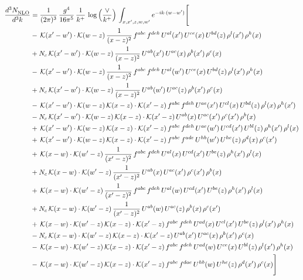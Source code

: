 \documentclass[9pt]{article}
\numberwithin{equation}{section}
\begin{document}
\begin{align}
    \frac{d^{3}N_{\rm NLO}^{\rm}}{d^{3}k}  & = \frac{1}{(2\pi)^{3}}\,\frac{g^{4}}{16\pi^{5}}\,\frac{1}{k^{+}}\,\log{\left(\frac{\vee}{k^{+}}\right)}\, \int_{x,x',z,w,w'}e^{-ik\cdot (w-w')}\Bigg[\notag\\ &
    -\,\mathcal{K}(x'-w')\cdot\mathcal{K}(w-z)\,\frac{1}{(x-z)^{2}}\,f^{abc}\,f^{deh}\,U^{al}(x')\,U^{ce}(x)\,U^{bd}(z)\,\rho^{l}(x')\,\rho^{h}(x)\notag \\ 
&+N_{c}\,\mathcal{K}(x'-w')\cdot\mathcal{K}(w-z)\,\frac{1}{(x-z)^{2}}\,U^{ab}(x')\,U^{ac}(x)\,\rho^{b}(x')\,\rho^{c}(x)\notag \\ 
&-\,\mathcal{K}(x'-w')\cdot\mathcal{K}(w-z)\,\frac{1}{(x-z)^{2}}\,f^{abc}\,f^{deh}\,U^{al}(w')\,U^{ce}(x)\,U^{bd}(z)\,\rho^{l}(x')\,\rho^{h}(x)\notag \\ 
&+N_{c}\,\mathcal{K}(x'-w')\cdot\mathcal{K}(w-z)\,\frac{1}{(x-z)^{2}}\,U^{ab}(w')\,U^{ac}(z)\,\rho^{b}(x')\,\rho^{c}(x)\notag \\ 
&-\,\mathcal{K}(x'-w')\cdot\mathcal{K}(w-z)\,\mathcal{K}(x-z)\cdot\mathcal{K}(x'-z)\,f^{abc}\,f^{deh}\,U^{ae}(x')\,U^{cl}(x)\,U^{bd}(z)\,\rho^{l}(x)\,\rho^{h}(x')\notag \\ 
&-N_{c}\,\mathcal{K}(x'-w')\cdot\mathcal{K}(w-z)\,\mathcal{K}(x-z)\cdot\mathcal{K}(x'-z)\,U^{ab}(x)\,U^{ac}(x')\,\rho^{c}(x')\,\rho^{b}(x)\notag \\ 
&+\,\mathcal{K}(x'-w')\cdot\mathcal{K}(w-z)\,\mathcal{K}(x-z)\cdot\mathcal{K}(x'-z)\,f^{abc}\,f^{deh}\,U^{ae}(w')\,U^{cd}(x')\,U^{bl}(z)\,\rho^{h}(x')\,\rho^{l}(x)\notag \\ 
&+\,\mathcal{K}(x'-w')\cdot\mathcal{K}(w-z)\,\mathcal{K}(x-z)\cdot\mathcal{K}(x'-z)\,f^{abc}\,f^{ade}\,U^{hb}(w')\,U^{he}(z)\,\rho^{d}(x)\,\rho^{c}(x')\notag \\ 
&+\,\mathcal{K}(x-w)\cdot\mathcal{K}(w'-z)\,\frac{1}{(x'-z)^{2}}\,f^{abc}\,f^{deh}\,U^{al}(x)\,U^{cd}(x')\,U^{be}(z)\,\rho^{h}(x')\,\rho^{l}(x)\notag \\ 
&+N_{c}\,\mathcal{K}(x-w)\cdot\mathcal{K}(w'-z)\,\frac{1}{(x'-z)^{2}}\,U^{ab}(x)\,U^{ac}(x')\,\rho^{c}(x')\,\rho^{b}(x)\notag \\ 
&+\,\mathcal{K}(x-w)\cdot\mathcal{K}(w'-z)\,\frac{1}{(x'-z)^{2}}\,f^{abc}\,f^{deh}\,U^{al}(w)\,U^{cd}(x')\,U^{be}(z)\,\rho^{h}(x')\,\rho^{l}(x)\notag \\ 
&+N_{c}\,\mathcal{K}(x-w)\cdot\mathcal{K}(w'-z)\,\frac{1}{(x'-z)^{2}}\,U^{ab}(w)\,U^{ac}(z)\,\rho^{b}(x)\,\rho^{c}(x')\notag \\ 
&+\,\mathcal{K}(x-w)\cdot\mathcal{K}(w'-z)\,\mathcal{K}(x-z)\cdot\mathcal{K}(x'-z)\,f^{abc}\,f^{deh}\,U^{ad}(x)\,U^{cl}(x')\,U^{be}(z)\,\rho^{l}(x')\,\rho^{h}(x)\notag \\ 
&-N_{c}\,\mathcal{K}(x-w)\cdot\mathcal{K}(w'-z)\,\mathcal{K}(x-z)\cdot\mathcal{K}(x'-z)\,U^{ab}(x')\,U^{ac}(x)\,\rho^{b}(x')\,\rho^{c}(x)\notag \\ 
&-\,\mathcal{K}(x-w)\cdot\mathcal{K}(w'-z)\,\mathcal{K}(x-z)\cdot\mathcal{K}(x'-z)\,f^{abc}\,f^{deh}\,U^{ad}(w)\,U^{ce}(x)\,U^{bl}(z)\,\rho^{l}(x')\,\rho^{h}(x)\notag \\ 
&-\,\mathcal{K}(x-w)\cdot\mathcal{K}(w'-z)\,\mathcal{K}(x-z)\cdot\mathcal{K}(x'-z)\,f^{abc}\,f^{dae}\,U^{hb}(w)\,U^{he}(z)\,\rho^{d}(x')\,\rho^{c}(x)\Bigg]
\end{align}
\end{document}
